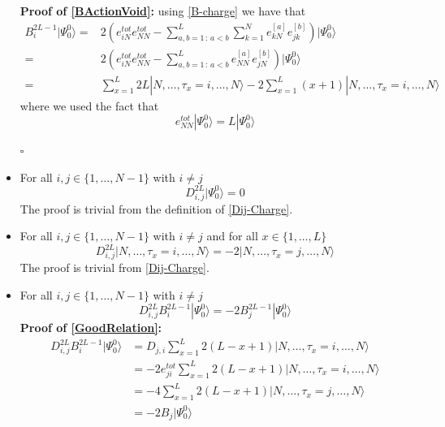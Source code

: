 \documentclass[10pt]{article}
\numberwithin{equation}{section}
\numberwithin{equation}{subsection}
\begin{document}
\begin{itemize}
\textbf{Proof of \eqref{BActionVoid}: } using \eqref{B-charge} we have that 
\begin{align}
	B_{i}^{2L-1}|\Psi_{0}^{0}\rangle=&2 \left(e_{iN}^{tot}e_{NN}^{tot}-\sum_{a,b=1\,:\,a<b}^{L}\sum_{k=1}^{N}e_{kN}^{[a]}e_{jk}^{[b]}\right)|\Psi_{0}^{0}\rangle\nonumber
	\\=&
	2\left(e_{iN}^{tot}e_{NN}^{tot}-\sum_{a,b=1\,:\,a<b}^{L}e_{NN}^{[a]}e_{jN}^{[b]}\right)|\Psi_{0}^{0}\rangle\nonumber\\=&
	\sum_{x=1}^{L}2L|N,\ldots,\tau_{x}=i,\ldots,N\rangle -2\sum_{x=1}^{L}(x+1)|N,\ldots,\tau_{x}=i,\ldots,N\rangle
\end{align}
where we used the fact that 
\begin{equation}\label{eNN-action}
	 e_{NN}^{tot}|\Psi_{0}^{0}\rangle=L|\Psi_{0}^{0}\rangle
\end{equation}
\begin{flushright}
	$\square$
\end{flushright}
\item For all $i,j\in\{1,\ldots,N-1\}$ with $i\neq j$
\begin{equation}\label{Dij-ref}
	D_{i,j}^{2L}|\Psi_{0}^{0}\rangle=0
\end{equation}
The proof is trivial from the definition of \eqref{Dij-Charge}. 
\item For all $i,j\in\{1,\ldots,N-1\}$ with $i\neq j$ and for all $x\in\{1,\ldots,L\}$ 
\begin{equation}
	D_{i,j}^{2L}|N,\ldots,\tau_{x}=i,\ldots,N\rangle=-2|N,\ldots,\tau_{x}=j,\ldots,N\rangle
\end{equation}
The proof is trivial from \eqref{Dij-Charge}. 
\item For all $i,j\in\{1,\ldots,N-1\}$ with $i\neq j$ 
\begin{equation}\label{GoodRelation}
	D_{i,j}^{2L}B_{i}^{2L-1}|\Psi_{0}^{0}\rangle=-2B_{j}^{2L-1}|\Psi_{0}^{0}\rangle
\end{equation}
\textbf{Proof of \eqref{GoodRelation}:}
\begin{align}
	D_{i,j}^{2L}B_{i}^{2L-1}|\Psi_{0}^{0}\rangle&= D_{j,i}\sum_{x=1}^{L}2(L-x+1)|N,\ldots,\tau_{x}=i,\ldots,N\rangle\nonumber
	\\&=
	-2e_{ji}^{tot}\sum_{x=1}^{L}2(L-x+1)|N,\ldots,\tau_{x}=i,\ldots,N\rangle\nonumber
	\\&=
	-4\sum_{x=1}^{L}2(L-x+1)|N,\ldots,\tau_{x}=j,\ldots,N\rangle\nonumber
	\\&=
	-2B_{j}|\Psi_{0}^{0}\rangle
\end{align}

\end{itemize}
\end{document}
